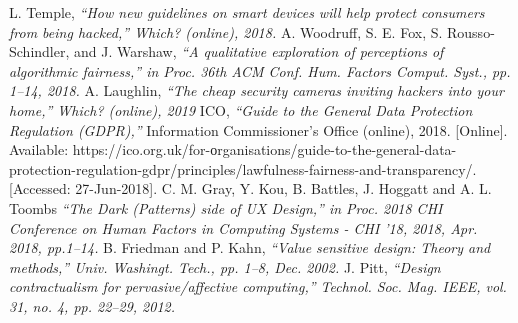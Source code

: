 \documentclass[a4paper]{article}
\begin{document}
\appendix

\begin{thebibliography}{seminarski}

 L. Temple, \emph{“How new guidelines on smart devices will help protect consumers from being hacked,” Which? (online), 2018.}
 A. Woodruff, S. E. Fox, S. Rousso-Schindler, and J. Warshaw, \emph{“A qualitative exploration of perceptions of algorithmic fairness,” in Proc. 36th ACM Conf. Hum. Factors Comput. Syst., pp. 1–14, 2018.}
 A. Laughlin, \emph{“The cheap security cameras inviting hackers into your home,” Which? (online), 2019}
 ICO,  \emph{“Guide  to  the  General  Data  Protection  Regulation  (GDPR),”}  Information Commissioner’s  Office  (online),  2018. [Online].  Available:
           https://ico.org.uk/for-оrganisations/guide-to-the-general-data-protection-regulation-gdpr/principles/lawfulness-fairness-and-transparency/. [Accessed: 27-Jun-2018].
 C. M. Gray, Y. Kou, B. Battles, J. Hoggatt and A. L. Toombs \emph{“The Dark (Patterns) side of UX Design,” in Proc. 2018 CHI Conference on Human Factors in Computing Systems - CHI ’18, 2018, Apr. 2018, pp.1–14.}
 B.  Friedman  and  P.  Kahn, \emph{“Value sensitive design: Theory and methods,” Univ. Washingt. Tech., pp. 1–8, Dec. 2002.}
 J.  Pitt,  \emph{“Design contractualism for pervasive/affective computing,” Technol. Soc. Mag. IEEE, vol. 31, no. 4, pp. 22–29, 2012.}

\end{thebibliography}
\end{document}
